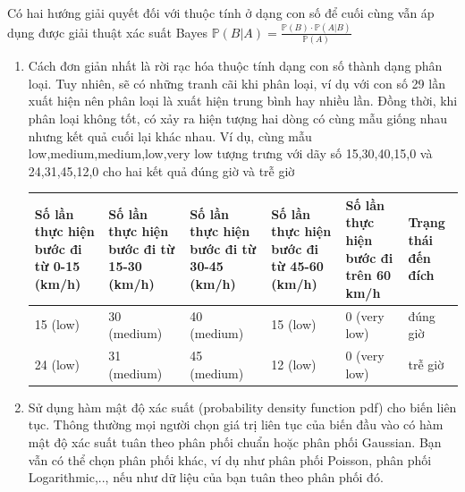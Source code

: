 \documentclass[a4paper, 13pt]{report}
\begin{document}
Có hai hướng giải quyết đối với thuộc tính ở dạng con số để cuối cùng vẫn áp dụng được giải thuật xác suất Bayes $\mathbb{P}(B|A) = \frac{\mathbb{P}(B) \cdot \mathbb{P}(A|B)}{\mathbb{P}(A)}$\\
\begin{enumerate}
\item Cách đơn giản nhất là rời rạc hóa thuộc tính dạng con số thành dạng phân loại. Tuy nhiên, sẽ có những tranh cãi khi phân loại, ví dụ với con số 29 lần xuất hiện nên phân loại là xuất hiện trung bình hay nhiều lần. Đồng thời, khi phân loại không tốt, có xảy ra hiện tượng hai dòng có cùng mẫu giống nhau nhưng kết quả cuối lại khác nhau. Ví dụ, cùng mẫu low,medium,medium,low,very low tượng trưng với dãy số 15,30,40,15,0 và 24,31,45,12,0 cho hai kết quả đúng giờ và trễ giờ\\ 
\begin{flushleft}
\begin{tabular}{|p{2.6cm}|p{2.6cm}|p{2.6cm}|p{2.6cm}|p{2.6cm}|p{1.5cm}|}
\hline
Số lần thực hiện bước đi từ 0-15 (km/h)& Số lần thực hiện bước đi từ 15-30 (km/h) & Số lần thực hiện bước đi từ 30-45 (km/h) & Số lần thực hiện bước đi từ 45-60 (km/h) & Số lần thực hiện bước đi trên 60 km/h & Trạng thái đến đích \\ 
\hline
15 (low) & 30 (medium) & 40 (medium) & 15 (low) & 0 (very low) & đúng giờ\\
\hline
24 (low) & 31 (medium) & 45 (medium) & 12 (low) & 0 (very low) & trễ giờ\\
\hline
\end{tabular}
\end{flushleft}
\item Sử dụng hàm mật độ xác suất (probability density function pdf) cho biến liên tục. Thông thường mọi người chọn giá trị liên tục của biến đầu vào có hàm mật độ xác suất tuân theo phân phối chuẩn hoặc phân phối Gaussian. Bạn vẫn có thể chọn phân phối khác, ví dụ như phân phối Poisson, phân phối Logarithmic,.., nếu như dữ liệu của bạn tuân theo phân phối đó.    
\end{enumerate}
\end{document}

